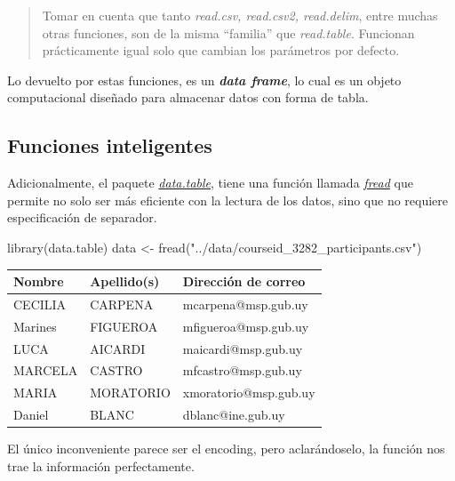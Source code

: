 \documentclass[
  letterpaper,
  DIV=11,
  numbers=noendperiod]{scrreprt}
\newenvironment{Shaded}{\begin{snugshade}}{\end{snugshade}}
\newcommand{\FunctionTok}[1]{\textcolor[rgb]{0.28,0.35,0.67}{#1}}
\newcommand{\NormalTok}[1]{\textcolor[rgb]{0.00,0.23,0.31}{#1}}
\newcommand{\OtherTok}[1]{\textcolor[rgb]{0.00,0.23,0.31}{#1}}
\newcommand{\StringTok}[1]{\textcolor[rgb]{0.13,0.47,0.30}{#1}}
\begin{document}
\begin{quote}
Tomar en cuenta que tanto \emph{read.csv, read.csv2, read.delim}, entre
muchas otras funciones, son de la misma ``familia'' que
\emph{read.table}. Funcionan prácticamente igual solo que cambian los
parámetros por defecto.
\end{quote}

Lo devuelto por estas funciones, es un \textbf{\emph{data frame}}, lo
cual es un objeto computacional diseñado para almacenar datos con forma
de tabla.

\hypertarget{funciones-inteligentes}{%
\subsection{Funciones inteligentes}\label{funciones-inteligentes}}

Adicionalmente, el paquete
\href{https://www.rdocumentation.org/packages/data.table/versions/1.14.2}{\emph{data.table}},
tiene una función llamada
\href{https://www.rdocumentation.org/packages/data.table/versions/1.14.2/topics/fread}{\emph{fread}}
que permite no solo ser más eficiente con la lectura de los datos, sino
que no requiere especificación de separador.

\begin{Shaded}
\begin{Highlighting}[]
\FunctionTok{library}\NormalTok{(data.table)}
\NormalTok{data }\OtherTok{\textless{}{-}} \FunctionTok{fread}\NormalTok{(}\StringTok{"../data/courseid\_3282\_participants.csv"}\NormalTok{)}
\end{Highlighting}
\end{Shaded}

\begin{longtable}[]{@{}lll@{}}
\toprule()
Nombre & Apellido(s) & Dirección de correo \\
\midrule()
\endhead
CECILIA & CARPENA & mcarpena@msp.gub.uy \\
Marines & FIGUEROA & mfigueroa@msp.gub.uy \\
LUCA & AICARDI & maicardi@msp.gub.uy \\
MARCELA & CASTRO & mfcastro@msp.gub.uy \\
MARIA & MORATORIO & xmoratorio@msp.gub.uy \\
Daniel & BLANC & dblanc@ine.gub.uy \\
\bottomrule()
\end{longtable}

El único inconveniente parece ser el encoding, pero aclarándoselo, la
función nos trae la información perfectamente.
\end{document}

